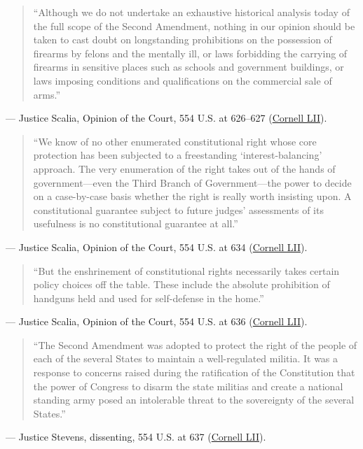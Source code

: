 \documentclass[12pt]{article}
\begin{document}
\begin{quote}
``Although we do not undertake an exhaustive historical analysis today of the full scope of the Second Amendment, nothing in our opinion should be taken to cast doubt on longstanding prohibitions on the possession of firearms by felons and the mentally ill, or laws forbidding the carrying of firearms in sensitive places such as schools and government buildings, or laws imposing conditions and qualifications on the commercial sale of arms.''
\end{quote}
\noindent --- Justice Scalia, Opinion of the Court, 554 U.S. at 626--627 (\href{https://www.law.cornell.edu/supct/html/07-290.ZO.html}{Cornell LII}).

\begin{quote}
``We know of no other enumerated constitutional right whose core protection has been subjected to a freestanding `interest-balancing' approach. The very enumeration of the right takes out of the hands of government---even the Third Branch of Government---the power to decide on a case-by-case basis whether the right is really worth insisting upon. A constitutional guarantee subject to future judges' assessments of its usefulness is no constitutional guarantee at all.''
\end{quote}
\noindent --- Justice Scalia, Opinion of the Court, 554 U.S. at 634 (\href{https://www.law.cornell.edu/supct/html/07-290.ZO.html}{Cornell LII}).

\begin{quote}
``But the enshrinement of constitutional rights necessarily takes certain policy choices off the table. These include the absolute prohibition of handguns held and used for self-defense in the home.''
\end{quote}
\noindent --- Justice Scalia, Opinion of the Court, 554 U.S. at 636 (\href{https://www.law.cornell.edu/supct/html/07-290.ZO.html}{Cornell LII}).

\begin{quote}
``The Second Amendment was adopted to protect the right of the people of each of the several States to maintain a well-regulated militia. It was a response to concerns raised during the ratification of the Constitution that the power of Congress to disarm the state militias and create a national standing army posed an intolerable threat to the sovereignty of the several States.''
\end{quote}
\noindent --- Justice Stevens, dissenting, 554 U.S. at 637 (\href{https://www.law.cornell.edu/supct/html/07-290.ZD.html}{Cornell LII}).
\end{document}
